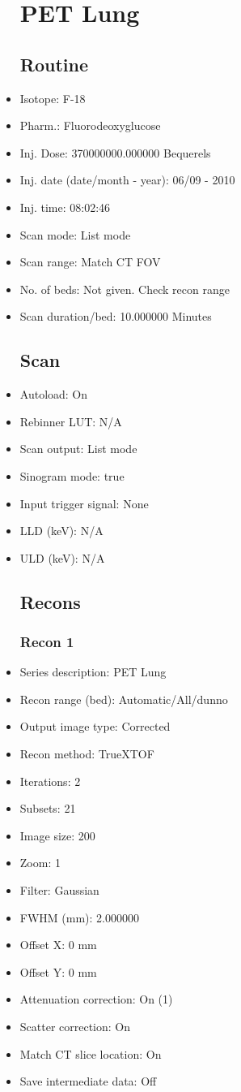 \documentclass[12pt]{article}
\begin{document}
\begin{itemize}
\section{PET Lung }\subsection{Routine}
\item Isotope: F-18
\item Pharm.: Fluorodeoxyglucose
\item Inj. Dose: 370000000.000000 Bequerels
\item Inj. date (date/month - year): 06/09 - 2010
\item Inj. time: 08:02:46
\item Scan mode: List mode
\item Scan range: Match CT FOV
\item No. of beds: Not given. Check recon range
\item Scan duration/bed: 10.000000 Minutes
\subsection{Scan}
\item Autoload: On
\item Rebinner LUT: N/A
\item Scan output: List mode
\item Sinogram mode: true
\item Input trigger signal: None
\item LLD (keV): N/A
\item ULD (keV): N/A
\subsection{Recons}
\subsubsection{Recon 1}
\item Series description: PET Lung
\item Recon range (bed): Automatic/All/dunno
\item Output image type: Corrected
\item Recon method: TrueXTOF
\item Iterations: 2
\item Subsets: 21
\item Image size: 200
\item Zoom: 1
\item Filter: Gaussian
\item FWHM (mm): 2.000000
\item Offset X: 0 mm
\item Offset Y: 0 mm
\item Attenuation correction: On (1)
\item Scatter correction: On
\item Match CT slice location: On
\item Save intermediate data: Off

\end{itemize}
\end{document}
